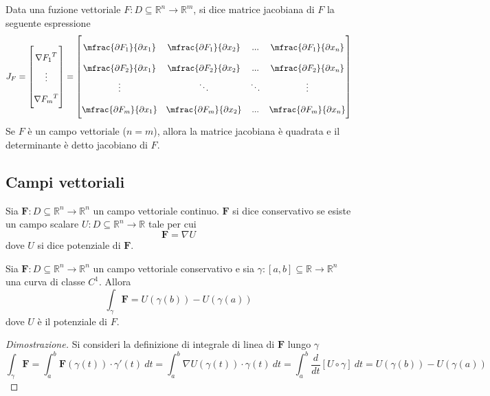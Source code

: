             Data una fuzione vettoriale $F: D \subseteq \mathbb{R}^{n} \rightarrow \mathbb{R}^{m}$, si dice matrice jacobiana di $F$ la seguente espressione
            \[
                J_{F} =
                \begin{bmatrix}
                    {\nabla F_{1}}^{T} \\
                    \vdots \\
                    {\nabla F_{m}}^{T}
                \end{bmatrix}
                =
                \renewcommand{\arraystretch}{2}
                \begin{bmatrix}
                    \mfrac{\partial F_{1}}{\partial x_1} & \mfrac{\partial F_{1}}{\partial x_2} & ... & \mfrac{\partial F_{1}}{\partial x_n} \\
                    \mfrac{\partial F_{2}}{\partial x_1} & \mfrac{\partial F_{2}}{\partial x_2} & ... & \mfrac{\partial F_{2}}{\partial x_n} \\
                    \vdots & \ddots & \ddots & \vdots \\
                    \mfrac{\partial F_{m}}{\partial x_1} & \mfrac{\partial F_{m}}{\partial x_2} & ... & \mfrac{\partial F_{m}}{\partial x_n} \\
                \end{bmatrix}
            \]
            Se $F$ è un campo vettoriale ($n = m$), allora la matrice jacobiana è quadrata e il determinante è detto jacobiano di $F$.

        \subsection{Campi vettoriali}
            Sia $\mathbf{F}: D \subseteq \mathbb{R}^{n} \rightarrow \mathbb{R}^{n}$ un campo vettoriale continuo. $\mathbf{F}$ si dice conservativo se esiste un campo scalare $U: D \subseteq \mathbb{R}^{n} \rightarrow \mathbb{R}$ tale per cui
            \[
                \mathbf{F} = \nabla U
            \]
            dove $U$ si dice potenziale di $\mathbf{F}$.


            \begin{theorem}
                Sia $\mathbf{F}: D \subseteq \mathbb{R}^{n} \rightarrow \mathbb{R}^{n}$ un campo vettoriale conservativo e sia $\gamma: [a, b] \subseteq \mathbb{R} \rightarrow \mathbb{R}^{n}$ una curva di classe $C^{1}$.
                Allora
                \[
                        \int_{\gamma} \mathbf{F} = U(\gamma(b)) - U(\gamma(a))
                \]
                dove $U$ è il potenziale di $F$.
            \end{theorem}
            \begin{proof}[Dimostrazione]
                Si consideri la definizione di integrale di linea di $\mathbf{F}$ lungo $\gamma$
                \[
                    \int_{\gamma} \mathbf{F} = \int_{a}^{b} \mathbf{F}(\gamma(t)) \cdot \gamma'(t) \: dt = \int_{a}^{b} \nabla U(\gamma(t)) \cdot \gamma(t) \: dt = \int_{a}^{b} \frac{d}{dt}\left[ U \circ \gamma \right] \: dt = U(\gamma(b)) - U(\gamma(a))
                \]
            \end{proof}

